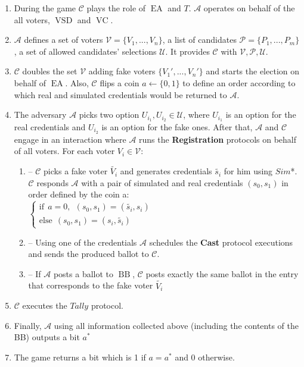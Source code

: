 \documentclass[12pt]{article}
\DeclareMathOperator{\vsd}{VSD}
\DeclareMathOperator{\ea}{EA}
\DeclareMathOperator{\bb}{BB}
\DeclareMathOperator{\voc}{VC}
\begin{document}
\begin{enumerate}
\item During the game $\mathcal{C}$ plays the role of $\ea$ and $T$. $\mathcal{A}$ operates on behalf of the all voters, $\vsd$ and $\voc$. 
\item $\mathcal{A}$ defines a set of voters  $\mathcal{V} = \{V_1,...,V_n\}$, a list of candidates  $\mathcal{P} = \{P_1,...,P_m\}$, a set of allowed candidates' selections $\mathcal{U}$.  It provides $\mathcal{C}$ with $\mathcal{V}, \mathcal{P}, \mathcal{U}$.
\item $\mathcal{C}$ doubles the set $\mathcal{V}$ adding fake voters $ \{V_1',...,V_n'\}$ and starts the election on behalf of $\ea$. Also, $\mathcal{C}$ flips a coin $a \leftarrow \{0,1\}$ to define an order according to which real and simulated credentials would be returned to $\mathcal{A}$. 
\item The adversary $\mathcal{A}$ picks two option $U_{i_1},U_{i_2} \in \mathcal{U}$, where $U_{i_1}$ is an option for the real credentials and $U_{i_2}$ is an option for the fake ones.  After that, $\mathcal{A}$  and $\mathcal{C}$ engage in an interaction where $\mathcal{A}$ runs the \textbf{Registration} protocols on behalf of all voters. For each voter $V_i \in \mathcal{V}$:
\begin{enumerate}
\item[] -- $\mathcal{C}$ picks a fake voter $\tilde{V_i}$ and generates credentials $\tilde{s_i}$ for him using $Sim$*.  $\mathcal{C}$  responds  $\mathcal{A}$ with a pair of simulated and real credentials $(s_0,s_1)$ in order defined by the coin a:\\
$ \begin{cases}
 \text{if} ~~a =0,~~ (s_0,s_1) = (\tilde{s_i},s_i)  \\ 
 \text{else}~~  (s_0,s_1) = (s_i,\tilde{s_i})
\end{cases}$\\

 \item[] -- Using one of the credentials $\mathcal{A}$ schedules the \textbf{Cast} protocol executions and sends the produced ballot to $\mathcal{C}$.
\item[] --  If  $\mathcal{A}$ posts a ballot to $\bb$, $\mathcal{C}$ posts exactly the same ballot in the entry that corresponds to the fake voter $\tilde{V_i}$
\end{enumerate}
\item  $\mathcal{C}$ executes the $Tally$ protocol.  
\item Finally, $\mathcal{A}$ using all information collected above (including the contents of the BB) outputs a bit $a^*$
\item The game returns a bit which is 1 if $a = a^*$ and 0 otherwise.
\end{enumerate}
\end{document}
